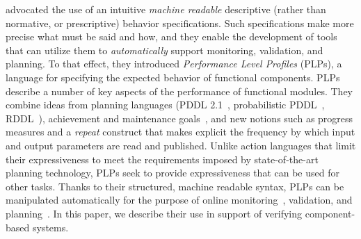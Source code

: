 \documentclass[letterpaper]{article}
\begin{document}
\citet{PLP-IROS16} advocated the use of an intuitive {\em machine readable\/} descriptive (rather than normative, or prescriptive) behavior specifications. Such specifications make more precise what must be said and how,
and they enable the development of tools that can utilize them to {\em automatically\/} support monitoring, validation, and planning.
%
To that effect, they introduced {\em Performance Level Profiles} (PLPs), a language for specifying the expected behavior of functional components.
PLPs describe a number of key aspects of the performance of functional modules. They combine ideas from planning languages (PDDL 2.1~\citep{PDDL2.1}, probabilistic PDDL~\citep{YouLit04}, RDDL~\citep{RDDL}), achievement and maintenance goals~\citep{PRS, aamas07maint}, and new notions such as progress measures and a {\em repeat\/} construct that makes explicit the frequency by which input and
output parameters are read and published. Unlike action languages that limit their expressiveness to meet the requirements imposed by state-of-the-art planning technology, PLPs seek to provide expressiveness that can be used for other tasks.
%
Thanks to their structured, machine readable syntax, PLPs can be manipulated automatically for the purpose of online monitoring~\citep{PLP-IROS16}, validation, and planning~\citep{PlanRob16}. In this paper, we describe their use in support of verifying component-based systems.

\end{document}

